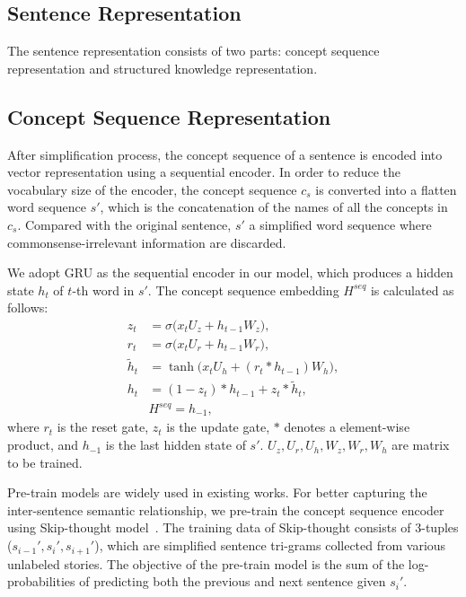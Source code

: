 \subsection{Sentence Representation}
\label{sec:represent}
The sentence representation consists of two parts:
concept sequence representation and structured knowledge representation.

\subsection*{Concept Sequence Representation}

After simplification process, the concept sequence of a sentence
is encoded into vector representation using a sequential encoder.
In order to reduce the vocabulary size of the encoder,
the concept sequence $c_s$ is converted into a flatten word sequence $s'$,
which is the concatenation of the names of all the concepts in $c_s$.
Compared with the original sentence, $s'$ a simplified word sequence
where commonsense-irrelevant information are discarded.

We adopt GRU as the sequential encoder in our model,
which produces a hidden state $h_t$ of $t$-th word in $s'$.
The concept sequence embedding $H^{seq}$ is calculated
as follows:
\begin{equation}
\begin{aligned}
  z_{t} & =\sigma\big(x_{t}U_{z}+h_{t-1}W_{z}\big), \\
  r_{t} & =\sigma\big(x_{t}U_{r}+h_{t-1}W_{r}\big), \\
  \tilde{h}_{t} & =\tanh\big(x_{t}U_{h}+(r_{t}\ast h_{t-1})W_{h}\big), \\
  h_{t} & =(1-z_{t})\ast h_{t-1}+z_{t}\ast\tilde{h}_{t}, \\
        & H^{seq} = h_{-1},
\end{aligned}
\end{equation}
\noindent
where $r_{t} $ is the reset gate,
$z_{t}$ is the update gate,
$\ast$ denotes a element-wise product,
and $h_{-1}$ is the last hidden state of $s'$.
$U_{z},U_{r},U_{h},W_{z}, W_{r}, W_{h}$ are matrix to be trained.

Pre-train models are widely used in existing works.
For better capturing the inter-sentence semantic relationship,
we pre-train the concept sequence encoder using Skip-thought model~\cite{kiros2015skip}.
The training data of Skip-thought consists of 3-tuples
($s_{i-1}', s_i', s_{i+1}'$), which are simplified sentence tri-grams
collected from various unlabeled stories.
The objective of the pre-train model is the sum of the log-probabilities
of predicting both the previous and next sentence given $s_i'$.


